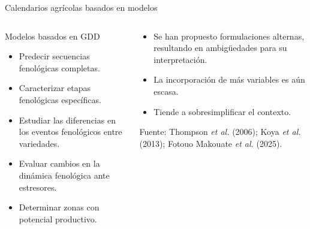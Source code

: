 \documentclass[aspectratio=169]{beamer}
\begin{document}
\begin{frame}{Calendarios agrícolas basados en modelos}
	\vspace*{-1cm}\begin{columns}
		\begin{block}{Modelos basados en GDD}
			\begin{itemize}
				\item Predecir secuencias fenológicas completas.
				\item Caracterizar etapas fenológicas específicas.
				\item Estudiar las diferencias en los
				eventos fenológicos entre variedades.
				\item Evaluar cambios en
				la dinámica fenológica ante estresores.
				\item Determinar zonas con potencial productivo.
			\end{itemize}
		\end{block}
		\pause\begin{block}{}
			\begin{itemize}
				\item Se han propuesto formulaciones alternas, resultando en ambigüedades para su interpretación.
				\item La incorporación de más variables es aún escasa.
				\item Tiende a sobresimplificar el contexto.
			\end{itemize}
			{\tiny Fuente: Thompson \textit{et al.} (2006); Koya \textit{et al.} (2013); Fotouo Makouate \textit{et al.} (2025).}
		\end{block}
	\end{columns}
\end{frame}
\end{document}
